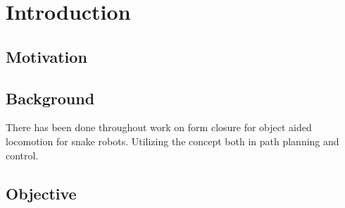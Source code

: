 \chapter{Introduction}
\label{chap:introduction}


\section{Motivation}
\label{sec:motivation}


\section{Background}
\label{sec:background}

There has been done throughout work on form closure for object aided locomotion for snake robots. Utilizing the concept both in path planning and control.

\section{Objective}
\label{sec:objective}


